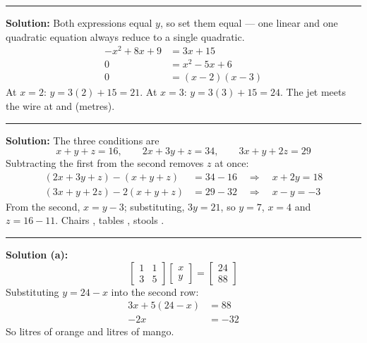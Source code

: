 \documentclass[12pt]{article}
\begin{document}
\vspace{0.2cm}\noindent\rule{\linewidth}{0.2pt}


\textbf{Solution:} Both expressions equal $y$, so set them equal --- one linear and one
quadratic equation always reduce to a single quadratic.
\begin{align*}
  -x^2 + 8x + 9 &= 3x + 15 \\
  0 &= x^2 - 5x + 6 \\
  0 &= (x - 2)(x - 3)
\end{align*}
At $x = 2$: $y = 3(2) + 15 = 21$. At $x = 3$: $y = 3(3) + 15 = 24$.
The jet meets the wire at  and  (metres).

\vspace{0.2cm}\noindent\rule{\linewidth}{0.2pt}


\textbf{Solution:} The three conditions are
\[ x + y + z = 16, \qquad 2x + 3y + z = 34, \qquad 3x + y + 2z = 29 \]
Subtracting the first from the second removes $z$ at once:
\begin{align*}
  (2x + 3y + z) - (x + y + z) &= 34 - 16 \quad\Longrightarrow\quad x + 2y = 18 \\
  (3x + y + 2z) - 2(x + y + z) &= 29 - 32 \quad\Longrightarrow\quad x - y = -3
\end{align*}
From the second, $x = y - 3$; substituting, $3y = 21$, so $y = 7$, $x = 4$ and
$z = 16 - 11$. Chairs , tables , stools .

\vspace{0.2cm}\noindent\rule{\linewidth}{0.2pt}


\textbf{Solution (a):}
\[ \begin{bmatrix} 1 & 1 \\ 3 & 5 \end{bmatrix}
   \begin{bmatrix} x \\ y \end{bmatrix} = \begin{bmatrix} 24 \\ 88 \end{bmatrix} \]
Substituting $y = 24 - x$ into the second row:
\begin{align*}
  3x + 5(24 - x) &= 88 \\
  -2x &= -32
\end{align*}
So  litres of orange and  litres of mango.
\end{document}
